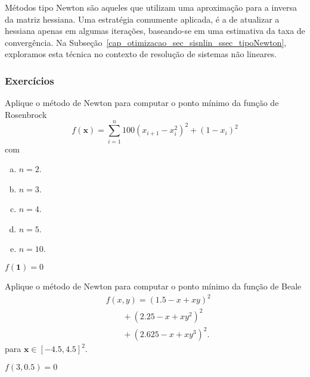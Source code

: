 \begin{obs}
  Métodos tipo Newton são aqueles que utilizam uma aproximação para a inversa da matriz hessiana. Uma estratégia comumente aplicada, é a de atualizar a hessiana apenas em algumas iterações, baseando-se em uma estimativa da taxa de convergência. Na Subseção~\ref{cap_otimizacao_sec_sisnlin_ssec_tipoNewton}, exploramos esta técnica no contexto de resolução de sistemas não lineares.
\end{obs}

\subsubsection{Exercícios}
\badgeRevisar

\begin{exer}
  Aplique o método de Newton para computar o ponto mínimo da função de Rosenbrock{\rosenbrock}
  \begin{equation}
    f(\pmb{x}) = \sum_{i=1}^n 100\left(x_{i+1}-x_i^2\right)^2 + (1-x_i)^2
  \end{equation}
  com
  \begin{enumerate}[a)]
    \item $n = 2$.
    \item $n = 3$.
    \item $n = 4$.
    \item $n = 5$.
    \item $n = 10$.
  \end{enumerate}
\end{exer}
\begin{resp}
$f(\pmb{1}) = 0$
\end{resp}

\begin{exer}
  Aplique o método de Newton para computar o ponto mínimo da função de Beale \cite{Beale1955a}
  \begin{equation}
    \begin{aligned}
      & f(x,y) = (1.5-x+xy)^2 \\
      &\qquad + (2.25-x+xy^2)^2 \\
      &\qquad + (2.625-x+xy^3)^2.
    \end{aligned}
  \end{equation}
  para $\pmb{x}\in [-4.5, 4.5]^2$.
\end{exer}
\begin{resp}
  $f(3, 0.5) = 0$
\end{resp}

